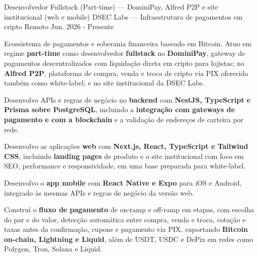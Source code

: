 

\begin{cventries}

  \cventry
    {Desenvolvedor Fullstack (Part-time) --- DominiPay, Alfred P2P e site institucional (web e mobile)} %
    {DSEC Labs --- Infraestrutura de pagamentos em cripto} %
    {Remoto} %
    {Jun. 2026 - Presente} %
    {
      \begin{cvitems} %
        \item {Ecossistema de pagamentos e soberania financeira baseado em Bitcoin. Atuo em regime \textbf{part-time} como desenvolvedor \textbf{fullstack} no \textbf{DominiPay}, gateway de pagamentos descentralizados com liquidação direta em cripto para lojistas; no \textbf{Alfred P2P}, plataforma de compra, venda e troca de cripto via PIX oferecida também como white-label; e no site institucional da DSEC Labs.}
        \item {Desenvolvo APIs e regras de negócio no \textbf{backend} com \textbf{NestJS, TypeScript e Prisma sobre PostgreSQL}, incluindo a \textbf{integração com gateways de pagamento e com a blockchain} e a validação de endereços de carteira por rede.}
        \item {Desenvolvo as aplicações \textbf{web} com \textbf{Next.js, React, TypeScript e Tailwind CSS}, incluindo \textbf{landing pages} de produto e o site institucional com foco em SEO, performance e responsividade, em uma base preparada para white-label.}
        \item {Desenvolvo o \textbf{app mobile} com \textbf{React Native e Expo} para iOS e Android, integrado às mesmas APIs e regras de negócio da versão web.}
        \item {Construí o \textbf{fluxo de pagamento} de on-ramp e off-ramp em etapas, com escolha do par e do valor, detecção automática entre compra, venda e troca, cotação e taxas antes da confirmação, cupons e pagamento via PIX, suportando \textbf{Bitcoin on-chain, Lightning e Liquid}, além de USDT, USDC e DePix em redes como Polygon, Tron, Solana e Liquid.}

\end{cvitems}}
\end{cventries}
